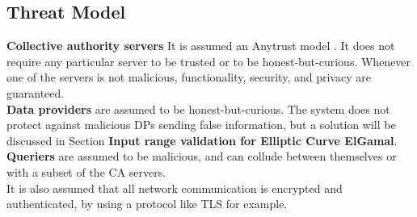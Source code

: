 \documentclass{article}
\begin{document}
\subsection{Threat Model}
\textbf{Collective authority servers} It is assumed an Anytrust model \cite{anytrust}. It does not require any particular server to be trusted or to be honest-but-curious. Whenever one of the servers is not malicious, functionality, security, and privacy are guaranteed.\\
\textbf{Data providers} are assumed to be honest-but-curious. The system does not protect against malicious DPs sending false information, but a solution will be discussed  in Section \textbf{Input range validation for Elliptic Curve ElGamal}.\\
\textbf{Queriers} are assumed to be malicious, and can collude between themselves or with a subset of the CA servers.\\
It is also assumed that all network communication is encrypted and authenticated, by using a protocol like TLS for example.
\end{document}
